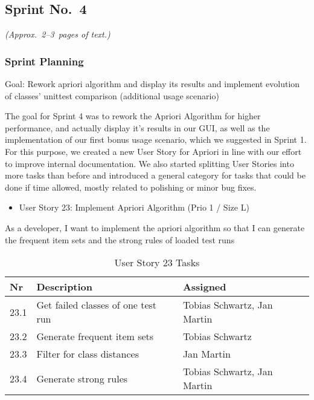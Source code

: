 
\subsection{Sprint No.~4}

\emph{(Approx.~2--3~pages of text.)}

\subsubsection*{Sprint Planning}

Goal: Rework apriori algorithm and display its results and implement evolution of classes' unittest comparison (additional usage scenario)

The goal for Sprint 4 was to rework the Apriori Algorithm for higher performance, and actually display it's results in our GUI, as well as the implementation of our first bonus usage scenario, which we suggested in Sprint 1. 
For this purpose, we created a new User Story for Apriori in line with our effort to improve internal documentation.
We also started splitting User Stories into more tasks than before and introduced a general category for tasks that could be done if time allowed, mostly related to polishing or minor bug fixes.

\begin{itemize}
	\item User Story 23: Implement Apriori Algorithm (Prio 1 / Size L)
	\end{itemize}
As a developer,
I want to implement the apriori algorithm
so that I can generate the frequent item sets and the strong rules of loaded test runs
\begin{table}[h]
  \caption{User Story 23 Tasks}
  \label{Story 23 Tasks}
  \centering
  \begin{tabular}{p{1cm}|p{5cm}|p{3cm}|}
  	Nr & Description & Assigned \\ 
  	\hline
  	23.1 & Get failed classes of one test run & Tobias Schwartz, Jan Martin \\ 
  	\hline
  	23.2 & Generate frequent item sets & Tobias Schwartz \\ 
  	\hline
  	23.3 & Filter for class distances & Jan Martin \\ 
  	\hline
  	23.4 & Generate strong rules & Tobias Schwartz, Jan Martin \\ 
  	\hline
  \end{tabular}
\end{table}

